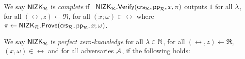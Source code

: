\begin{definition}\label{def:nizk_completeness}
	We say ${\mathsf{NIZK}}_\mathcal{R}$ is {\em complete} if \ ${\mathsf{NIZK}}_\mathcal{R}.{\mathsf{Verify}}(\mathsf{crs}_\mathcal{R},  \mathsf{pp}_\mathcal{R}, x, \pi)$ outputs $ 1 $ for all 
	$ \lambda $, for all $ (\rel,z) \leftarrow \mathfrak{R} $, for all $(x; \omega) \in \rel$ where $ \pi \leftarrow {\ensuremath{\mathsf{NIZK}}}_\mathcal{R}.{\mathsf{Prove}}(\mathsf{crs}_\mathcal{R}, \mathsf{pp}_\mathcal{R}, x; \omega) $.  %
\end{definition}

\def\advV{\ensuremath{V^*}\xspace} %

\begin{definition}\label{def:nizk_zero_knowledge}
	We say ${\mathsf{NIZK}}_\mathcal{R}$ is {\em perfect zero-knowledge} for all $ \lambda \in \mathbb{N} $, for all $ (\rel,z) \leftarrow \mathfrak{R} $, $ (x,\omega) \in \rel $ and for all adversaries $ \mathcal{A} $, if the following holds:
	\allowbreak
	\doublecolumn{\begin{align*}
		\Pr[& \adv(\crs_\rel,  \pp_\rel, z, \pi,\rel) = 1 \ | \ (\crs_\rel, \tw_\rel,  \pp_\rel) \leftarrow \NIZK_\rel.\Setup (1^{\lambda}),  \\\nonumber
		& \pi \leftarrow \NIZK_\rel.\Prove (\crs_\rel, \pp_\rel, x;\omega)]\\
		=\Pr[& \adv(\crs_\rel,  \pp_\rel, z, \pi,\rel) = 1 \ | \ (\crs_\rel, \tw,  \pp_\rel) \leftarrow \NIZK_\rel.\Setup (1^{\lambda}), \\\nonumber
		&  \pi \leftarrow \NIZK_\rel.\Simulate (\tw_\rel,  \pp_\rel, x)]
	\end{align*}
}{\begin{align*}
	\Pr[& \adv(\crs_\rel, \pp_\rel, z, \pi,\rel) = 1 \ | \ (\crs_\rel, \tw_\rel, \pp_\rel) \leftarrow \NIZK_\rel.\Setup (1^{\lambda}),   \pi \leftarrow \NIZK_\rel.\Prove (\crs_\rel,  \pp_\rel, x; \omega)]\\
	=\Pr[& \adv(\crs_\rel,  \pp_\rel, z, \pi,\rel) = 1 \ | \ (\crs_\rel, \tw_\rel, \pp_\rel) \leftarrow \NIZK_\rel.\Setup (1^{\lambda}),   \pi \leftarrow \NIZK_\rel.\Simulate (\tw_\rel,  \pp_\rel, x)]
\end{align*}}
	
\end{definition}

\def\advP{\ensuremath{P^*}\xspace} %

